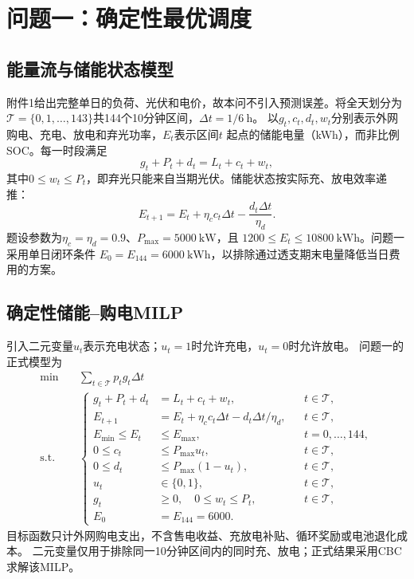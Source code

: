 \section{问题一：确定性最优调度}

\subsection{能量流与储能状态模型}
附件1给出完整单日的负荷、光伏和电价，故本问不引入预测误差。将全天划分为
$\mathcal T=\{0,1,\ldots,143\}$共144个10分钟区间，$\Delta t=1/6\ \mathrm{h}$。
以$g_t,c_t,d_t,w_t$分别表示外网购电、充电、放电和弃光功率，$E_t$表示区间$t$
起点的储能电量（kWh），而非比例SOC。每一时段满足
\begin{equation}
 g_t+P_t+d_t=L_t+c_t+w_t,
 \label{eq:p1-balance}
\end{equation}
其中$0\le w_t\le P_t$，即弃光只能来自当期光伏。储能状态按实际充、放电效率递推：
\begin{equation}
 E_{t+1}=E_t+\eta_c c_t\Delta t-\frac{d_t\Delta t}{\eta_d}.
 \label{eq:p1-soc}
\end{equation}
题设参数为$\eta_c=\eta_d=0.9$、$P_{\max}=5000\ \mathrm{kW}$，且
$1200\le E_t\le10800\ \mathrm{kWh}$。问题一采用单日闭环条件
$E_0=E_{144}=6000\ \mathrm{kWh}$，以排除通过透支期末电量降低当日费用的方案。

\subsection{确定性储能--购电MILP}
引入二元变量$u_t$表示充电状态；$u_t=1$时允许充电，$u_t=0$时允许放电。
问题一的正式模型为
\begin{equation}
\begin{aligned}
\min\quad &\sum_{t\in\mathcal T}p_tg_t\Delta t\\[-2pt]
\text{s.t.}\quad&
\left\{\begin{aligned}
 g_t+P_t+d_t&=L_t+c_t+w_t,&&t\in\mathcal T,\\
 E_{t+1}&=E_t+\eta_c c_t\Delta t-d_t\Delta t/\eta_d,
     &&t\in\mathcal T,\\
 E_{\min}\le E_t&\le E_{\max},&&t=0,\ldots,144,\\
 0\le c_t&\le P_{\max}u_t,&&t\in\mathcal T,\\
 0\le d_t&\le P_{\max}(1-u_t),&&t\in\mathcal T,\\
 u_t&\in\{0,1\},&&t\in\mathcal T,\\
 g_t&\ge0,\quad 0\le w_t\le P_t,&&t\in\mathcal T,\\
 E_0&=E_{144}=6000.
\end{aligned}\right.
\end{aligned}
\label{eq:p1-model}
\end{equation}
目标函数只计外网购电支出，不含售电收益、充放电补贴、循环奖励或电池退化成本。
二元变量仅用于排除同一10分钟区间内的同时充、放电；正式结果采用CBC求解该MILP。

